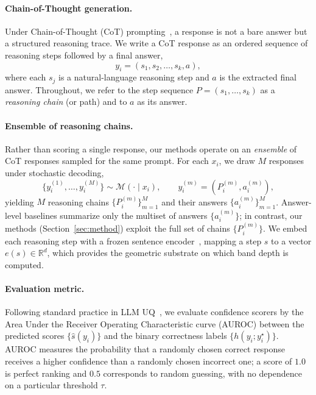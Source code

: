 \documentclass[11pt]{article}
\begin{document}
\paragraph{Chain-of-Thought generation.}
Under Chain-of-Thought (CoT) prompting~\citep{wei2022chain}, a response is not a
bare answer but a structured reasoning trace. We write a CoT response as an
ordered sequence of reasoning steps followed by a final answer,
\begin{equation}
  y_i = (s_1, s_2, \ldots, s_k, a),
\end{equation}
where each $s_j$ is a natural-language reasoning step and $a$ is the extracted
final answer. Throughout, we refer to the step sequence
$P = (s_1, \ldots, s_k)$ as a \emph{reasoning chain} (or path) and to $a$ as its
answer.

\paragraph{Ensemble of reasoning chains.}
Rather than scoring a single response, our methods operate on an \emph{ensemble}
of CoT responses sampled for the same prompt. For each $x_i$, we draw $M$
responses under stochastic decoding,
\begin{equation}
  \{ y_i^{(1)}, \ldots, y_i^{(M)} \} \sim \mathcal{M}(\cdot \mid x_i),
  \qquad
  y_i^{(m)} = (P_i^{(m)}, a_i^{(m)}),
\end{equation}
yielding $M$ reasoning chains $\{P_i^{(m)}\}_{m=1}^{M}$ and their answers
$\{a_i^{(m)}\}_{m=1}^{M}$. Answer-level baselines summarize only the multiset of
answers $\{a_i^{(m)}\}$; in contrast, our methods (Section~\ref{sec:method})
exploit the full set of chains $\{P_i^{(m)}\}$. We embed each reasoning step with
a frozen sentence encoder~\citep{reimers2019sentencebert}, mapping a step $s$ to
a vector $e(s) \in \mathbb{R}^d$, which provides the geometric substrate on
which band depth is computed.

\paragraph{Evaluation metric.}
Following standard practice in LLM UQ~\citep{kuhn2023semantic, xiong2024llms}, we
evaluate confidence scorers by the Area Under the Receiver Operating
Characteristic curve (AUROC) between the predicted scores $\{\hat{s}(y_i)\}$ and
the binary correctness labels $\{h(y_i; y_i^\star)\}$. AUROC measures the
probability that a randomly chosen correct response receives a higher confidence
than a randomly chosen incorrect one; a score of $1.0$ is perfect ranking and
$0.5$ corresponds to random guessing, with no dependence on a particular
threshold $\tau$.
\end{document}
